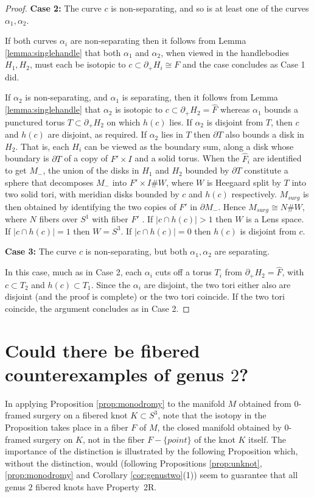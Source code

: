 \documentclass{amsart}
\newcommand{\aaa}{\mbox{$\alpha$}}
\newcommand{\bdd}{\mbox{$\partial$}}
\begin{document}
\begin{proof}
{\bf Case 2:}  The curve $c$ is non-separating, and so is at least one of the curves $\aaa_1, \aaa_2$.

If both curves $\aaa_i$ are non-separating then it follows from Lemma \ref{lemma:singlehandle} that both $\aaa_1$ and $\aaa_2$, when viewed in the handlebodies $H_1, H_2$, must each be isotopic to $c \subset \bdd_+ H_i \cong F$ and the case concludes as Case 1 did.

If $\aaa_2$ is non-separating, and $\aaa_1$ is separating, then it follows from Lemma \ref{lemma:singlehandle} that $\aaa_2$  is isotopic to $c \subset \bdd_+ H_2 = \hat{F}$ whereas $\aaa_1$ bounds a punctured torus $T \subset \bdd_+ H_2$ on which $h(c)$ lies.  If $\aaa_2$ is disjoint from $T$, then $c$ and $h(c)$ are disjoint, as required.  If $\aaa_2$ lies in $T$ then $\bdd T$ also bounds a disk in $H_2$.   That is, each $H_i$ can be viewed as the boundary sum, along a disk whose boundary is $\bdd T$ of a copy of $F' \times I$ and a solid torus.  When the $\hat{F}_i$ are identified to get $M_-$, the union of the disks in $H_1$ and $H_2$ bounded by $\bdd T$ constitute a sphere that decomposes $M_-$ into $F' \times I \# W$, where $W$ is Heegaard split by $T$ into two solid tori, with meridian disks bounded by $c$ and $h(c)$ respectively.  $M_{surg}$ is then obtained by identifying the two copies of $F'$ in $\bdd M_-$.  Hence $M_{surg} \cong N \# W$, where $N$ fibers over $S^1$ with fiber $F'$ .  If $|c \cap h(c)| > 1$ then $W$ is a Lens space. If $|c \cap h(c)| = 1$ then $W = S^3$.  If $|c \cap h(c)| = 0$ then $h(c)$ is disjoint from $c$.

\medskip

{\bf Case 3:} The curve $c$ is non-separating, but both $\aaa_1, \aaa_2$ are separating.

In this case, much as in Case 2, each $\aaa_i$ cuts off a torus $T_i$ from $\bdd_+ H_2 = \hat{F}$, with $c \subset T_2$ and $h(c) \subset T_1$.  Since the $\aaa_i$ are disjoint, the two tori either also are disjoint (and the proof is complete) or the two tori coincide.  If the two tori coincide, the argument concludes as in Case 2.  \end{proof}

\section{Could there be fibered counterexamples of genus $2$?}

In applying Proposition \ref{prop:monodromy} to the manifold $M$ obtained from $0$-framed surgery on a fibered knot $K \subset S^3$, note that the isotopy in the Proposition takes place in a fiber $F$ of $M$, the closed manifold obtained by $0$-framed surgery on $K$, not in the fiber $F - \{ point \}$ of the knot $K$ itself.   The importance of the distinction is illustrated by the following Proposition which, without the distinction, would (following Propositions \ref{prop:unknot}, \ref{prop:monodromy} and Corollary \ref{cor:genustwo}(1)) seem to guarantee that all genus $2$ fibered knots have Property~2R.
\end{document}
